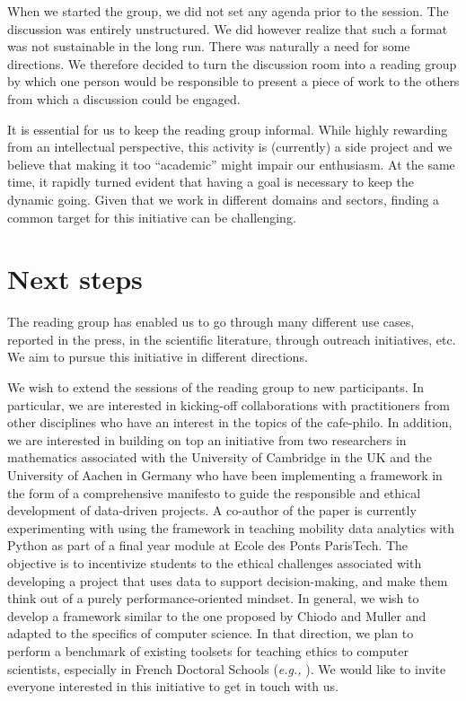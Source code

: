 \documentclass[conference]{IEEEtran}
\begin{document}
When we  started the  group, we did  not set any  agenda prior  to the
session.  The discussion  was  entirely unstructured.  We did  however
realize that such a format was  not sustainable in the long run. There
was naturally a need for some directions. We therefore decided to turn
the discussion room into a reading  group by which one person would be
responsible to  present a  piece of  work to the  others from  which a
discussion could be engaged.

It  is essential  for us  to keep  the reading  group informal.  While
highly rewarding  from an  intellectual perspective, this  activity is
(currently)  a  side  project  and  we  believe  that  making  it  too
“academic” might impair  our enthusiasm. At the same  time, it rapidly
turned evident  that having a  goal is  necessary to keep  the dynamic
going. Given that we work in  different domains and sectors, finding a
common target for this initiative can be challenging.

\section{Next steps}

The reading group has enabled us to go through many different use cases, reported in the press, in the scientific literature, through outreach initiatives, etc. We aim to pursue this initiative in different directions.

We wish to extend the sessions of the reading group to new participants. In particular, we are interested in kicking-off collaborations with practitioners from other disciplines who have an interest in the topics of the cafe-philo. In addition, we are interested in building on top an initiative from two researchers in mathematics associated with the University of Cambridge in the UK and the University of Aachen in Germany who have been implementing a framework in the form of a comprehensive manifesto \cite{chiodo23} to guide the responsible and ethical development of data-driven projects. A co-author of the paper is currently experimenting with using the framework in teaching mobility data analytics with Python as part of a final year module at Ecole des Ponts ParisTech. The objective is to incentivize students to the ethical challenges associated with developing a project that uses data to support decision-making, and make them think out of a purely performance-oriented mindset. In general, we wish to develop a framework similar to the one proposed by Chiodo and Muller and adapted to the specifics of computer science. In that direction, we plan to perform a benchmark of existing toolsets for teaching ethics to computer scientists, especially in French Doctoral Schools (\textit{e.g.,} \cite{moocEthics}). We would like to invite everyone interested in this initiative to get in touch with us.      
\end{document}
